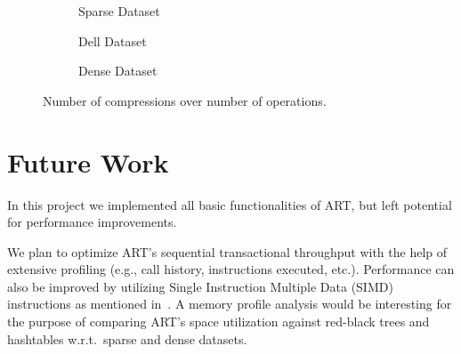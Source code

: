 \documentclass[abstracton,12pt]{scrartcl}
\theoremstyle{definition}
\begin{document}
\begin{figure}[H]
  \centering
  \begin{subfigure}[b]{0.30\textwidth}
    \caption{Sparse Dataset}
    \label{fig:compressions-sparse}
  \end{subfigure}
  \begin{subfigure}[b]{0.30\textwidth}
    \caption{Dell Dataset}
    \label{fig:compressions-paths}
  \end{subfigure}
  \begin{subfigure}[b]{0.30\textwidth}
    \caption{Dense Dataset}
    \label{fig:compressions-dense}
  \end{subfigure}
  \caption{Number of compressions over number of operations.}
\end{figure}

\vspace{-5mm}
\section{Future Work}
\label{sec:future-work}

In this project we implemented all basic functionalities of ART, but left 
potential for performance improvements.

We plan to optimize ART's sequential transactional throughput with the help of
extensive profiling (e.g., call history, instructions executed, etc.).
Performance can also be improved by utilizing Single Instruction
Multiple Data (SIMD) instructions as mentioned in~\cite{leis2013adaptive}.
A memory profile analysis would be interesting for the purpose of comparing
ART's space utilization against red-black trees and hashtables w.r.t.\ sparse
and dense datasets.
\end{document}
